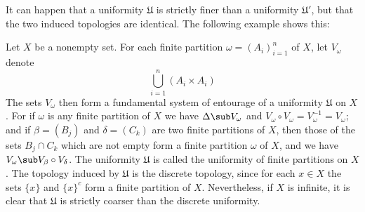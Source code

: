 It can happen that a uniformity $\mathfrak{U}$ is strictly finer than a uniformity $\mathfrak{U}'$, but that the two induced topologies are identical. The following example shows this:
\begin{example}\label{uniformity of finite partition}
Let $X$ be a nonempty set. For each finite partition $\omega=(A_i)_{i=1}^{n}$ of $X$, let $V_{\omega}$ denote
\[\bigcup_{i=1}^{n}(A_i\times A_i)\]
The sets $V_\omega$ then form a fundamental system of entourage of a uniformity $\mathfrak{U}$ on $X$. For if $\omega$ is any finite partition of $X$ we have $\Delta\sub V_\omega$ and $V_\omega\circ V_\omega=V_\omega^{-1}=V_\omega$; and if $\beta=(B_j)$ and $\delta=(C_k)$ are two finite partitions of $X$, then those of the sets $B_j\cap C_k$ which are not empty form a finite partition $\omega$ of $X$, and we have $V_\omega\sub V_\beta\circ V_\delta$. The uniformity $\mathfrak{U}$ is called the uniformity of finite partitions on $X$. The topology induced by $\mathfrak{U}$ is the discrete topology, since for each $x\in X$ the sets $\{x\}$ and $\{x\}^c$ form a finite partition of $X$. Nevertheless, if $X$ is infinite, it is clear that $\mathfrak{U}$ is strictly coarser than the discrete uniformity.
\end{example}
